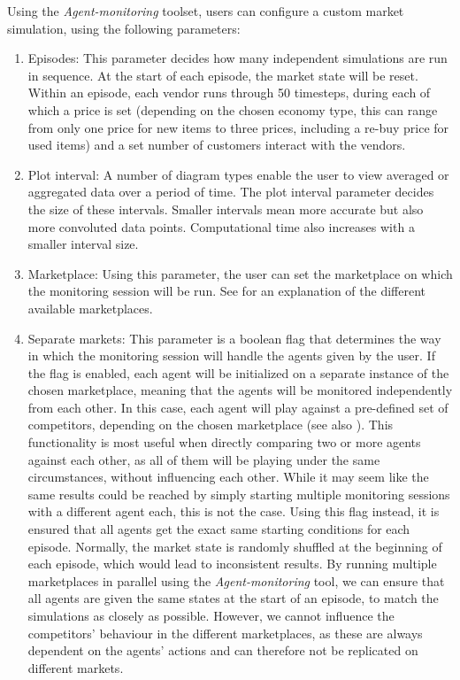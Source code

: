 Using the \emph{Agent-monitoring} toolset, users can configure a custom market simulation, using the following parameters:

\begin{enumerate}
	\item Episodes: This parameter decides how many independent simulations are run in sequence. At the start of each episode, the market state will be reset. Within an episode, each vendor runs through 50 timesteps, during each of which a price is set (depending on the chosen economy type, this can range from only one price for new items to three prices, including a re-buy price for used items) and a set number of customers interact with the vendors.
	\item Plot interval: A number of diagram types enable the user to view averaged or aggregated data over a period of time. The plot interval parameter decides the size of these intervals. Smaller intervals mean more accurate but also more convoluted data points. Computational time also increases with a smaller interval size.
	\item Marketplace: Using this parameter, the user can set the marketplace on which the monitoring session will be run. See  for an explanation of the different available marketplaces.
	\item Separate markets: This parameter is a boolean flag that determines the way in which the monitoring session will handle the agents given by the user. If the flag is enabled, each agent will be initialized on a separate instance of the chosen marketplace, meaning that the agents will be monitored independently from each other. In this case, each agent will play against a pre-defined set of competitors, depending on the chosen marketplace (see also ). This functionality is most useful when directly comparing two or more agents against each other, as all of them will be playing under the same circumstances, without influencing each other. While it may seem like the same results could be reached by simply starting multiple monitoring sessions with a different agent each, this is not the case. Using this flag instead, it is ensured that all agents get the exact same starting conditions for each episode. Normally, the market state is randomly shuffled at the beginning of each episode, which would lead to inconsistent results. By running multiple marketplaces in parallel using the \emph{Agent-monitoring} tool, we can ensure that all agents are given the same states at the start of an episode, to match the simulations as closely as possible. However, we cannot influence the competitors' behaviour in the different marketplaces, as these are always dependent on the agents' actions and can therefore not be replicated on different markets.


\end{enumerate}
